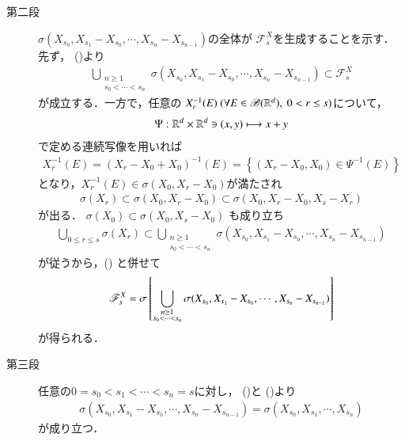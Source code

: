 \begin{prf}[Problem 1.4]
\begin{description}
		\item[第二段]
			$\sigma(X_{s_0},X_{s_1}-X_{s_0},\cdots,X_{s_n} - X_{s_{n-1}})$の全体が
			$\mathscr{F}^X_s$を生成することを示す．先ず，
			()より
			\begin{align}
				\bigcup_{\substack{n \geq 1 \\ s_0 < \cdots < s_n}} 
				\sigma(X_{s_0},X_{s_1}-X_{s_0},\cdots,X_{s_n} - X_{s_{n-1}})
				\subset \mathscr{F}^X_s
				\label{eq:thm_application_dynkin_system_theorem_to_independence_3}
			\end{align}
			が成立する．一方で，任意の
			$X_r^{-1}(E)\ (\forall E \in \mathscr{B}(\mathbb{R}^d),\ 0 < r \leq s)$について，
			\begin{align}
				\Psi:\mathbb{R}^d \times \mathbb{R}^d \ni (x,y) \longmapsto x + y
			\end{align}
			で定める連続写像を用いれば
			\begin{align}
				X_r^{-1}(E)
				= \left( X_r - X_0 + X_0 \right)^{-1}(E)
				= \left\{\left( X_r - X_0, X_0\right) \in \Psi^{-1}(E) \right\}
			\end{align}
			となり，$X_r^{-1}(E) \in \sigma(X_0, X_r - X_0)$が満たされ
			\begin{align}
				\sigma(X_r) \subset \sigma(X_0, X_r - X_0)
				\subset \sigma(X_0, X_r - X_0,X_s - X_r)
				\label{eq:thm_application_dynkin_system_theorem_to_independence_4}
			\end{align}
			が出る．
			$\sigma(X_0) \subset \sigma(X_0,X_s - X_0)$
			も成り立ち
			\begin{align}
				\bigcup_{0 \leq r \leq s} \sigma(X_r) \subset 
				\bigcup_{\substack{n \geq 1 \\ s_0 < \cdots < s_n}} \sigma(X_{s_0},X_{s_1}-X_{s_0},\cdots,X_{s_n} - X_{s_{n-1}})
			\end{align}
			が従うから，()
			と併せて
			\begin{align}
				\mathscr{F}^X_s
				= \sigma \left[\bigcup_{\substack{n \geq 1 \\ s_0 < \cdots < s_n}} \sigma(X_{s_0},X_{s_1}-X_{s_0},\cdots,X_{s_n} - X_{s_{n-1}})\right]
				\label{eq:thm_application_dynkin_system_theorem_to_independence_5}
			\end{align}
			が得られる．
		
		\item[第三段]
			任意の$0 = s_0 < s_1 < \cdots < s_n = s$に対し，
			()と
			()より
			\begin{align}
				\sigma(X_{s_0},X_{s_1}-X_{s_0},\cdots,X_{s_n} - X_{s_{n-1}})
				= \sigma(X_{s_0},X_{s_1},\cdots,X_{s_n})
				\label{eq:thm_application_dynkin_system_theorem_to_independence_6}
			\end{align}
			が成り立つ．
		

\end{description}
\end{prf}
